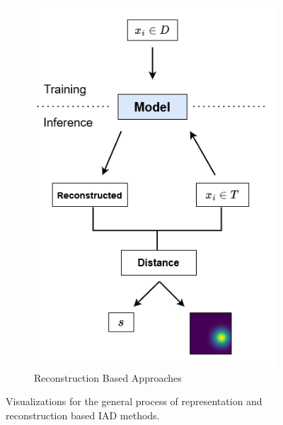 \begin{figure}
\begin{subfigure}[b]{0.44\textwidth}
        \includegraphics[width=\textwidth]{figures/rec_based.png}
        \caption{Reconstruction Based Approaches}
        \label{subfig:recbased}
    \end{subfigure}
    \caption{Visualizations for the general process of representation and reconstruction based IAD methods.}
    \label{fig:vizofrecrepbased}
\end{figure}